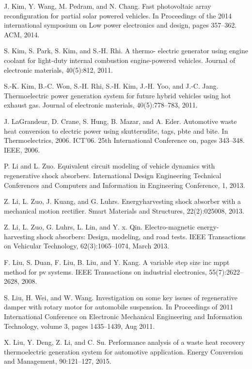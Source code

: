  J. Kim, Y. Wang, M. Pedram, and N. Chang. Fast photovoltaic array reconfiguration for partial solar powered vehicles. In Proceedings of the 2014 international symposium on Low power electronics and design, pages
357--362. ACM, 2014.

 S. Kim, S. Park, S. Kim, and S.-H. Rhi. A thermo-
electric generator using engine coolant for light-duty internal combustion engine-powered vehicles. Journal of electronic materials, 40(5):812, 2011.

 S.-K. Kim, B.-C. Won, S.-H. Rhi, S.-H. Kim, J.-H. Yoo, and J.-C. Jang. Thermoelectric power generation system for future hybrid vehicles using hot exhaust gas. Journal of electronic materials, 40(5):778--783, 2011.

 J. LaGrandeur, D. Crane, S. Hung, B. Mazar, and A. Eder. Automotive waste heat conversion to electric power using skutterudite, tags, pbte and bite. In Thermoelectrics, 2006. ICT’06. 25th International Conference on, pages 343--348. IEEE, 2006.

 P. Li and L. Zuo. Equivalent circuit modeling of vehicle dynamics with regenerative shock absorbers. International Design Engineering Technical Conferences and Computers and Information in Engineering Conference, 1, 2013.

 Z. Li, L. Zuo, J. Kuang, and G. Luhrs. Energyharvesting shock absorber with a mechanical motion rectifier. Smart Materials and Structures, 22(2):025008, 2013.

 Z. Li, L. Zuo, G. Luhrs, L. Lin, and Y. x. Qin. Electro-magnetic energy-harvesting shock absorbers: Design, modeling, and road tests. IEEE Transactions on Vehicular Technology, 62(3):1065--1074, March 2013.

 F. Liu, S. Duan, F. Liu, B. Liu, and Y. Kang. A variable step size inc mppt method for pv systems. IEEE Transactions on industrial electronics, 55(7):2622-- 2628, 2008.

 S. Liu, H. Wei, and W. Wang. Investigation on some key issues of regenerative damper with rotary motor for automobile suspension. In Proceedings of 2011 International Conference on Electronic Mechanical Engineering and Information Technology, volume 3, pages 1435--1439, Aug 2011.

 X. Liu, Y. Deng, Z. Li, and C. Su. Performance analysis of a waste heat recovery thermoelectric generation system for automotive application. Energy Conversion and Management, 90:121--127, 2015.

